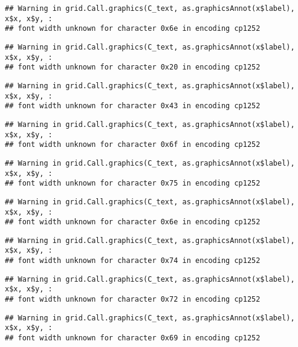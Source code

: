 \documentclass[
]{article}
\begin{document}
\begin{verbatim}
## Warning in grid.Call.graphics(C_text, as.graphicsAnnot(x$label), x$x, x$y, :
## font width unknown for character 0x6e in encoding cp1252
\end{verbatim}

\begin{verbatim}
## Warning in grid.Call.graphics(C_text, as.graphicsAnnot(x$label), x$x, x$y, :
## font width unknown for character 0x20 in encoding cp1252
\end{verbatim}

\begin{verbatim}
## Warning in grid.Call.graphics(C_text, as.graphicsAnnot(x$label), x$x, x$y, :
## font width unknown for character 0x43 in encoding cp1252
\end{verbatim}

\begin{verbatim}
## Warning in grid.Call.graphics(C_text, as.graphicsAnnot(x$label), x$x, x$y, :
## font width unknown for character 0x6f in encoding cp1252
\end{verbatim}

\begin{verbatim}
## Warning in grid.Call.graphics(C_text, as.graphicsAnnot(x$label), x$x, x$y, :
## font width unknown for character 0x75 in encoding cp1252
\end{verbatim}

\begin{verbatim}
## Warning in grid.Call.graphics(C_text, as.graphicsAnnot(x$label), x$x, x$y, :
## font width unknown for character 0x6e in encoding cp1252
\end{verbatim}

\begin{verbatim}
## Warning in grid.Call.graphics(C_text, as.graphicsAnnot(x$label), x$x, x$y, :
## font width unknown for character 0x74 in encoding cp1252
\end{verbatim}

\begin{verbatim}
## Warning in grid.Call.graphics(C_text, as.graphicsAnnot(x$label), x$x, x$y, :
## font width unknown for character 0x72 in encoding cp1252
\end{verbatim}

\begin{verbatim}
## Warning in grid.Call.graphics(C_text, as.graphicsAnnot(x$label), x$x, x$y, :
## font width unknown for character 0x69 in encoding cp1252
\end{verbatim}
\end{document}
